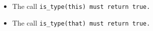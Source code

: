 \begin{itemize}

\item The call \tt{is_type(this)} must return \tt{true}.

\item The call \tt{is_type(that)} must return \tt{true}.

\end{itemize}
